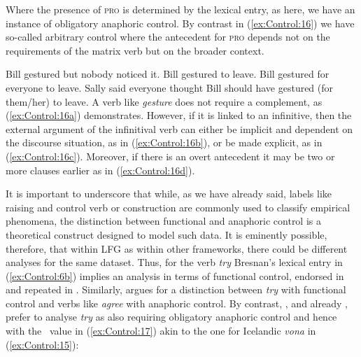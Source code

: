 \documentclass[output=paper,hidelinks]{langscibook}
\begin{document}
\ea\label{ex:Control:15}
\z

Where the presence of \textsc{pro} is determined by the lexical entry, as here, we have an instance of obligatory anaphoric control. By contrast in (\ref{ex:Control:16}) we have so-called arbitrary control where the antecedent for \textsc{pro} depends not on the requirements of the matrix verb but on the broader context.

\ea\label{ex:Control:16}
\ea\label{ex:Control:16a} Bill gestured but nobody noticed it.
\ex\label{ex:Control:16b} Bill gestured to leave.
\ex\label{ex:Control:16c} Bill gestured for everyone to leave.
\ex\label{ex:Control:16d} Sally said everyone thought Bill should have gestured (for them/her) to leave.
\z\z
A verb like \emph{gesture} does not require a complement, as (\ref{ex:Control:16a}) demonstrates. However, if it is linked to an infinitive, then the external argument of the infinitival verb can either be implicit and dependent on the discourse situation, as in (\ref{ex:Control:16b}), or be made explicit, as in (\ref{ex:Control:16c}). Moreover, if there is an overt antecedent it may be two or more clauses earlier as in (\ref{ex:Control:16d}).

It is important to underscore that while, as we have already said, labels like raising and control verb or construction are commonly used to classify empirical phenomena, the distinction between functional and anaphoric control is a theoretical construct designed to model such data. It is eminently possible, therefore, that within LFG as within other frameworks, there could be different analyses for the same dataset. Thus, for the verb \emph{try} Bresnan's lexical entry in (\ref{ex:Control:6b}) implies an analysis in terms of functional control, endorsed in \citet[644]{mohanan83} and repeated in \citet[103]{BoNoSa19}. Similarly, \citet[141--144]{falk2001lexical} argues for a distinction between \emph{try} with functional control and verbs like \emph{agree} with anaphoric control. By contrast, \citet[561--566]{DLM:LFG}, and already \citet[§4.2]{dalrymple01}, prefer to analyse \emph{try} as also requiring obligatory anaphoric control and hence with the \PRED\ value in (\ref{ex:Control:17}) akin to the one for Icelandic \emph{vona} in (\ref{ex:Control:15}):
\end{document}
